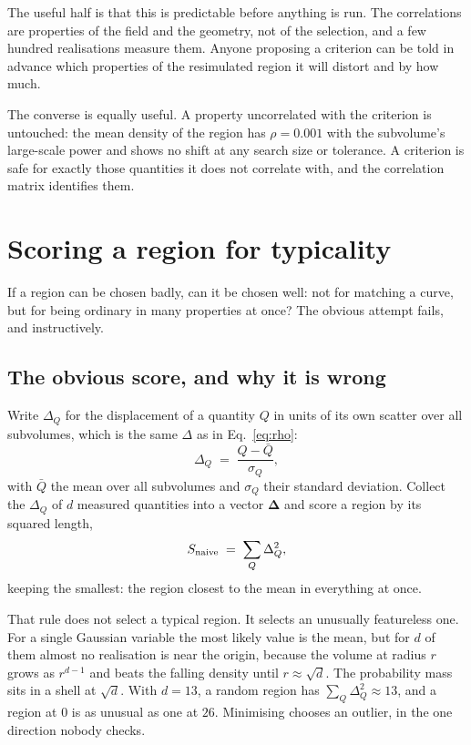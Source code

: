 \documentclass[12pt]{article}
\begin{document}
The useful half is that this is predictable before anything is run. The
correlations are properties of the field and the geometry, not of the selection,
and a few hundred realisations measure them. Anyone proposing a criterion can be
told in advance which properties of the resimulated region it will distort and
by how much.

The converse is equally useful. A property uncorrelated with the criterion is
untouched: the mean density of the region has $\rho = 0.001$ with the subvolume's
large-scale power and shows no shift at any search size or tolerance. A criterion
is safe for exactly those quantities it does not correlate with, and the
correlation matrix identifies them.

\section{Scoring a region for typicality}
\label{sec:typicality}

If a region can be chosen badly, can it be chosen well: not for matching a
curve, but for being ordinary in many properties at once? The obvious attempt
fails, and instructively.

\subsection{The obvious score, and why it is wrong}
\label{sec:blandness}

Write $\Delta_Q$ for the displacement of a quantity $Q$ in units of its own
scatter over all subvolumes, which is the same $\Delta$ as in
Eq.~\eqref{eq:rho}:
\begin{equation}
  \label{eq:deltaQ}
  \Delta_Q \;=\; \frac{Q - \bar Q}{\sigma_Q} ,
\end{equation}
with $\bar Q$ the mean over all subvolumes and $\sigma_Q$ their standard
deviation. Collect the $\Delta_Q$ of $d$ measured quantities into a vector
$\boldsymbol\Delta$ and score a region by its squared length,
\begin{equation}
  \label{eq:naive}
  S_{\rm naive} \;=\; \sum_{Q} \Delta_Q^2 ,
\end{equation}
keeping the smallest: the region closest to the mean in everything at once.

That rule does not select a typical region. It selects an unusually featureless
one. For a single Gaussian variable the most likely value is the mean, but for
$d$ of them almost no realisation is near the origin, because the volume at
radius $r$ grows as $r^{d-1}$ and beats the falling density until
$r \approx \sqrt{d}$. The probability mass sits in a shell at $\sqrt{d}$. With
$d = 13$, a random region has $\sum_Q \Delta_Q^2 \approx 13$, and a region at
$0$ is as unusual as one at $26$. Minimising chooses an outlier, in the one
direction nobody checks.
\end{document}
